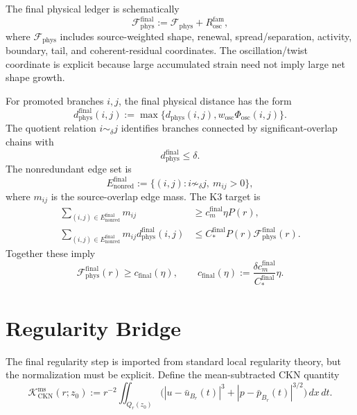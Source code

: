 \documentclass[11pt]{article}
\begin{document}
The final physical ledger is schematically
\begin{equation}
\label{eq:Fphys-final}
\mathcal F_{\mathrm{phys}}^{\mathrm{final}}
:=
\mathcal F_{\mathrm{phys}}
+R_{\mathrm{osc}}^{\mathrm{fam}},
\end{equation}
where \(\mathcal F_{\mathrm{phys}}\) includes source-weighted shape,
renewal, spread/separation, activity, boundary, tail, and coherent-residual
coordinates.  The oscillation/twist coordinate is explicit because large
accumulated strain need not imply large net shape growth.

For promoted branches \(i,j\), the final physical distance has the form
\begin{equation}
\label{eq:dphys-final}
d_{\mathrm{phys}}^{\mathrm{final}}(i,j)
:=
\max\{d_{\mathrm{phys}}(i,j),w_{\mathrm{osc}}\Phi_{\mathrm{osc}}(i,j)\}.
\end{equation}
The quotient relation \(i\sim_\delta j\) identifies branches connected by
significant-overlap chains with
\[
d_{\mathrm{phys}}^{\mathrm{final}}\le\delta.
\]
The nonredundant edge set is
\[
E_{\mathrm{nonred}}^{\mathrm{final}}
:=\{(i,j):i\not\sim_\delta j,\ m_{ij}>0\},
\]
where \(m_{ij}\) is the source-overlap edge mass.  The K3 target is
\begin{align}
\label{eq:K3-target-standalone}
\sum_{(i,j)\in E_{\mathrm{nonred}}^{\mathrm{final}}}m_{ij}
&\ge c_m^{\mathrm{final}}\eta P(r),\\
\sum_{(i,j)\in E_{\mathrm{nonred}}^{\mathrm{final}}}
m_{ij}d_{\mathrm{phys}}^{\mathrm{final}}(i,j)
&\le C_*^{\mathrm{final}}P(r)
\mathcal F_{\mathrm{phys}}^{\mathrm{final}}(r).
\end{align}
Together these imply
\begin{equation}
\label{eq:cfinal-def}
\mathcal F_{\mathrm{phys}}^{\mathrm{final}}(r)
\ge
c_{\mathrm{final}}(\eta),
\qquad
c_{\mathrm{final}}(\eta):=
\frac{\delta c_m^{\mathrm{final}}}{C_*^{\mathrm{final}}}\eta.
\end{equation}

\clearpage
\section{Regularity Bridge}
\label{sec:ckn-bridge}

The final regularity step is imported from standard local regularity theory,
but the normalization must be explicit.  Define the mean-subtracted CKN
quantity
\begin{equation}
\label{eq:KCKNms}
\mathcal K_{\mathrm{CKN}}^{\mathrm{ms}}(r;z_0)
:=
r^{-2}\iint_{Q_r(z_0)}
\Big(|u-\bar u_{B_r}(t)|^3
+|p-\bar p_{B_r}(t)|^{3/2}\Big)\,dx\,dt.
\end{equation}
\end{document}
